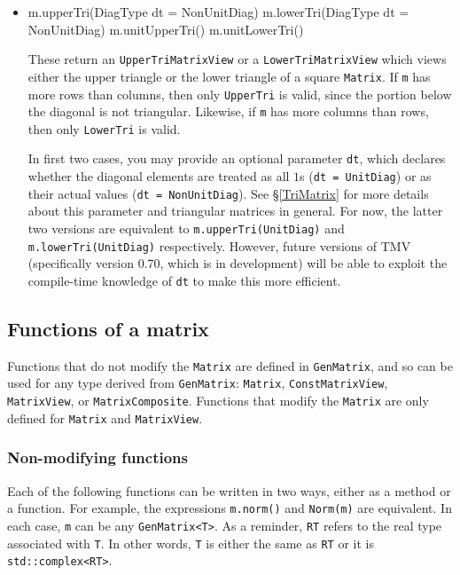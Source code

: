 \documentclass[twoside,letterpaper,11pt]{article}
\renewcommand{\tt}[1]{{\lstinline {#1}}}
\begin{document}
\begin{itemize}
\item
\begin{tmvcode}
m.upperTri(DiagType dt = NonUnitDiag)
m.lowerTri(DiagType dt = NonUnitDiag)
m.unitUpperTri()
m.unitLowerTri()
\end{tmvcode}
These return an \tt{UpperTriMatrixView} or a \tt{LowerTriMatrixView} which
views either the upper triangle or the lower triangle of a square \tt{Matrix}.
If \tt{m} has more rows than columns, then only \tt{UpperTri} is valid, since
the portion below the diagonal is not triangular.
Likewise, if \tt{m} has more columns than rows, then only \tt{LowerTri} is valid.

In first two cases, you may provide an optional parameter \tt{dt}, which
declares whether the diagonal elements are treated as all $1$s
(\tt{dt = UnitDiag}) or as their actual values (\tt{dt = NonUnitDiag}). 
See \S\ref{TriMatrix} for more details about this parameter and
triangular matrices in general.
For now, the latter two versions are equivalent to \tt{m.upperTri(UnitDiag)} and 
\tt{m.lowerTri(UnitDiag)} respectively.  However, future versions of TMV
(specifically version 0.70, which is in development) will be able to exploit
the compile-time knowledge of \tt{dt} to make this more efficient.

\end{itemize}

\subsection{Functions of a matrix}
\label{Matrix_Functions}

Functions that do not modify the \tt{Matrix} are defined in 
\tt{GenMatrix}, and so can be used for any type derived from \tt{GenMatrix}:
\tt{Matrix}, \tt{ConstMatrixView}, \tt{MatrixView}, or \tt{MatrixComposite}.
Functions that modify the \tt{Matrix} are only defined for 
\tt{Matrix} and \tt{MatrixView}.

\subsubsection{Non-modifying functions}

Each of the following functions can be written in two ways,
either as a method or a function.
For example, the expressions \tt{m.norm()} and \tt{Norm(m)}
are equivalent.  
In each case, \tt{m} can be any \tt{GenMatrix<T>}.
As a reminder, \tt{RT} refers to the real type associated with \tt{T}.
In other words, \tt{T} is either the same as \tt{RT} or it is
\tt{std::complex<RT>}.
\end{document}
